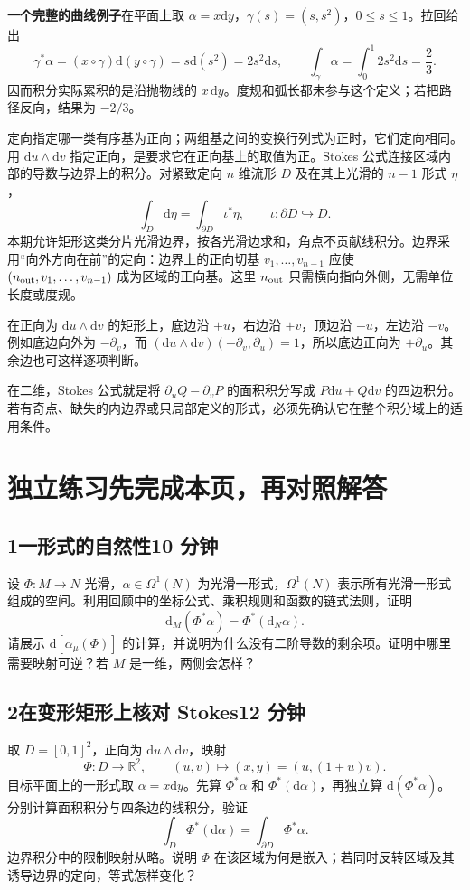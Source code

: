 \documentclass[11pt,a4paper]{article}
\newcommand{\D}{\mathrm d}
\newcommand{\head}[1]{\section*{\color{teal}#1}}
\begin{document}
\textbf{一个完整的曲线例子}\quad 在平面上取 $\alpha=x\D y$，$\gamma(s)=(s,s^2)$，$0\le s\le1$。拉回给出
\[
 \gamma^*\alpha=(x\circ\gamma)\D(y\circ\gamma)
 =s\D(s^2)=2s^2\D s,\qquad
 \int_\gamma\alpha=\int_0^1 2s^2\D s=\frac23.
\]
因而积分实际累积的是沿抛物线的 $x\,\D y$。度规和弧长都未参与这个定义；若把路径反向，结果为 $-2/3$。

定向指定哪一类有序基为正向；两组基之间的变换行列式为正时，它们定向相同。用 $\D u\wedge\D v$ 指定正向，是要求它在正向基上的取值为正。Stokes 公式连接区域内部的导数与边界上的积分。对紧致定向 $n$ 维流形 $D$ 及在其上光滑的 $n-1$ 形式 $\eta$，
\[
 \int_D\D\eta=\int_{\partial D}\iota^*\eta ,
 \qquad \iota:\partial D\hookrightarrow D .
\]
本期允许矩形这类分片光滑边界，按各光滑边求和，角点不贡献线积分。边界采用“向外方向在前”的定向：边界上的正向切基 $v_1,\ldots,v_{n-1}$ 应使 $(n_{\rm out},v_1,\ldots,v_{n-1})$ 成为区域的正向基。这里 $n_{\rm out}$ 只需横向指向外侧，无需单位长度或度规。

在正向为 $\D u\wedge\D v$ 的矩形上，底边沿 $+u$，右边沿 $+v$，顶边沿 $-u$，左边沿 $-v$。例如底边向外为 $-\partial_v$，而
$(\D u\wedge\D v)(-\partial_v,\partial_u)=1$，所以底边正向为 $+\partial_u$。其余边也可这样逐项判断。

在二维，Stokes 公式就是将 $\partial_uQ-\partial_vP$ 的面积积分写成 $P\D u+Q\D v$ 的四边积分。若有奇点、缺失的内边界或只局部定义的形式，必须先确认它在整个积分域上的适用条件。
\newpage
\head{独立练习\quad 先完成本页，再对照解答}
\subsection*{1\quad 一形式的自然性\hfill 10 分钟}
设 $\Phi:M\to N$ 光滑，$\alpha\in\Omega^1(N)$ 为光滑一形式，$\Omega^1(N)$ 表示所有光滑一形式组成的空间。利用回顾中的坐标公式、乘积规则和函数的链式法则，证明
\[
 \D_M(\Phi^*\alpha)=\Phi^*(\D_N\alpha).
\]
请展示 $\D[\alpha_\mu(\Phi)]$ 的计算，并说明为什么没有二阶导数的剩余项。证明中哪里需要映射可逆？若 $M$ 是一维，两侧会怎样？

\subsection*{2\quad 在变形矩形上核对 Stokes\hfill 12 分钟}
取 $D=[0,1]^2$，正向为 $\D u\wedge\D v$，映射
\[
 \Phi:D\to\mathbb R^2,\qquad (u,v)\mapsto(x,y)=(u,(1+u)v).
\]
目标平面上的一形式取 $\alpha=x\D y$。先算 $\Phi^*\alpha$ 和 $\Phi^*(\D\alpha)$，再独立算 $\D(\Phi^*\alpha)$。分别计算面积积分与四条边的线积分，验证
\[
 \int_D\Phi^*(\D\alpha)=\int_{\partial D}\Phi^*\alpha .
\]
边界积分中的限制映射从略。说明 $\Phi$ 在该区域为何是嵌入；若同时反转区域及其诱导边界的定向，等式怎样变化？
\end{document}
